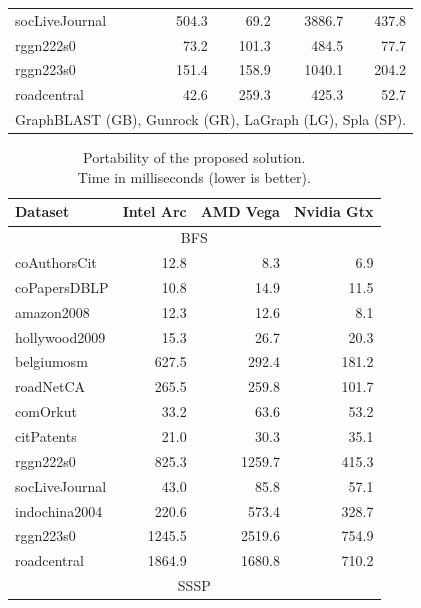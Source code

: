 \begin{table}[tbp]
\begin{center}
\begin{tabular}{|l|r|r|r|r|}
    \rowcolor{black!10} socLiveJournal&504.3&69.2&3886.7&437.8\\
    \rowcolor{black!2 } rggn222s0&73.2&101.3&484.5&77.7\\
    \rowcolor{black!10} rggn223s0&151.4&158.9&1040.1&204.2\\
    \rowcolor{black!2 } roadcentral&42.6&259.3&425.3&52.7\\
    \hline
    \hline
    \multicolumn{5}{l}{GraphBLAST (GB), Gunrock (GR), LaGraph (LG), Spla (SP).} \\
    \end{tabular}
    \label{rq1_table}
\end{center}
\end{table}

\begin{table}[tbp]
\caption{Portability of the proposed solution.\\Time in milliseconds (lower is better).} 
\begin{center}
    \begin{tabular}{|l|r|r|r|}
    \hline
    Dataset & Intel Arc & AMD Vega & Nvidia Gtx\\
    \hline
    \hline
    \multicolumn{4}{|c|}{BFS} \\
    \hline
    \rowcolor{black!10} coAuthorsCit&12.8&8.3&6.9\\
    \rowcolor{black!2 } coPapersDBLP&10.8&14.9&11.5\\
    \rowcolor{black!10} amazon2008&12.3&12.6&8.1\\
    \rowcolor{black!2 } hollywood2009&15.3&26.7&20.3\\
    \rowcolor{black!10} belgiumosm&627.5&292.4&181.2\\
    \rowcolor{black!2 } roadNetCA&265.5&259.8&101.7\\
    \rowcolor{black!10} comOrkut&33.2&63.6&53.2\\
    \rowcolor{black!2 } citPatents&21.0&30.3&35.1\\
    \rowcolor{black!10} rggn222s0&825.3&1259.7&415.3\\
    \rowcolor{black!2 } socLiveJournal&43.0&85.8&57.1\\
    \rowcolor{black!10} indochina2004&220.6&573.4&328.7\\
    \rowcolor{black!2 } rggn223s0&1245.5&2519.6&754.9\\
    \rowcolor{black!10} roadcentral&1864.9&1680.8&710.2\\
    \hline
    \hline
    \multicolumn{4}{|c|}{SSSP} \\

\end{tabular}
\end{center}
\end{table}
